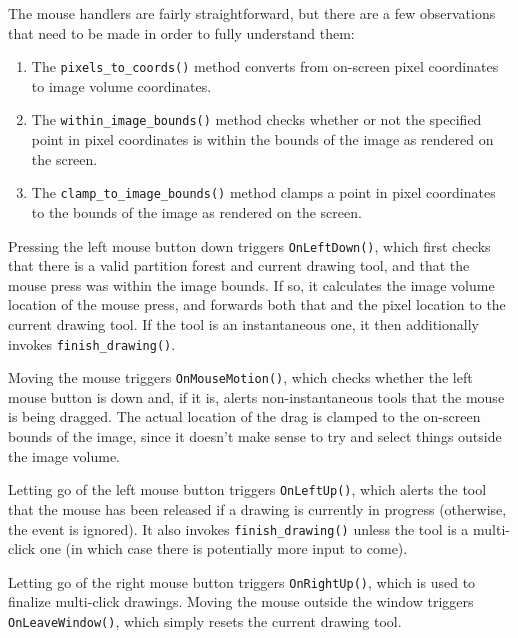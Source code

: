 The mouse handlers are fairly straightforward, but there are a few observations that need to be made in order to fully understand them:
%
\begin{enumerate}

\item The \texttt{pixels_to_coords()} method converts from on-screen pixel coordinates to image volume coordinates.
\item The \texttt{within_image_bounds()} method checks whether or not the specified point in pixel coordinates is within the bounds of the image as rendered on the screen.
\item The \texttt{clamp_to_image_bounds()} method clamps a point in pixel coordinates to the bounds of the image as rendered on the screen.

\end{enumerate}
%
Pressing the left mouse button down triggers \texttt{OnLeftDown()}, which first checks that there is a valid partition forest and current drawing tool, and that the mouse press was within the image bounds. If so, it calculates the image volume location of the mouse press, and forwards both that and the pixel location to the current drawing tool. If the tool is an instantaneous one, it then additionally invokes \texttt{finish_drawing()}.

Moving the mouse triggers \texttt{OnMouseMotion()}, which checks whether the left mouse button is down and, if it is, alerts non-instantaneous tools that the mouse is being dragged. The actual location of the drag is clamped to the on-screen bounds of the image, since it doesn't make sense to try and select things outside the image volume.

Letting go of the left mouse button triggers \texttt{OnLeftUp()}, which alerts the tool that the mouse has been released if a drawing is currently in progress (otherwise, the event is ignored). It also invokes \texttt{finish_drawing()} unless the tool is a multi-click one (in which case there is potentially more input to come).

Letting go of the right mouse button triggers \texttt{OnRightUp()}, which is used to finalize multi-click drawings. Moving the mouse outside the window triggers \texttt{OnLeaveWindow()}, which simply resets the current drawing tool.

